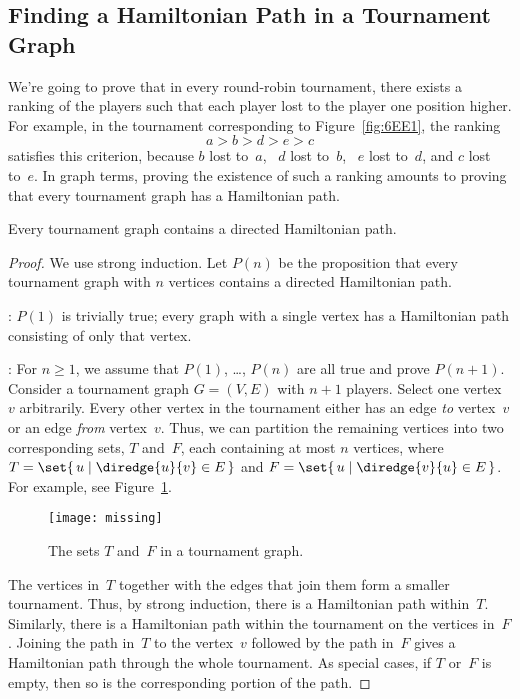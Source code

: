 \subsection{Finding a Hamiltonian Path in a Tournament Graph}

We're going to prove that in every round-robin tournament, there
exists a ranking of the players such that each player lost to the
player one position higher.  For example, in the tournament
corresponding to Figure~\ref{fig:6EE1}, the ranking
\begin{equation*}
    a > b > d > e > c
\end{equation*}
satisfies this criterion, because $b$ lost to~$a$, \ $d$ lost to~$b$,
\ $e$ lost to~$d$, and $c$ lost to~$e$.  In graph terms, proving the
existence of such a ranking amounts to proving that every tournament
graph has a Hamiltonian path.

\begin{theorem}\label{thm:hamilton_tournament}
Every tournament graph contains a directed Hamiltonian path.
\end{theorem}

\begin{proof}

We use strong induction.  Let $P(n)$ be the proposition that every
tournament graph with $n$ vertices contains a directed Hamiltonian
path.

: $P(1)$ is trivially true; every graph with
a single vertex has a Hamiltonian path consisting of only that vertex.

: For $n \ge 1$, we assume that $P(1)$,
\dots, $P(n)$ are all true and prove $P(n + 1)$.  Consider a
tournament graph $G = (V, E)$ with $n + 1$ players.  Select one
vertex~$v$ arbitrarily.  Every other vertex in the tournament either
has an edge \emph{to} vertex~$v$ or an edge \emph{from} vertex~$v$.
Thus, we can partition the remaining vertices into two corresponding
sets, $T$ and~$F$, each containing at most $n$ vertices, where $T =
\set{\, u \mid \diredge{u}{v} \in E \,}$ and
$F = \set{\, u \mid \diredge{v}{u} \in E \,}$.
For example, see Figure~\ref{fig:6EE2}.

\begin{figure}

\missinggraphic

\texttt{[image: missing]}

\caption{The sets $T$ and~$F$ in a tournament graph.}

\label{fig:6EE2}

\end{figure}

The vertices in~$T$ together with the edges that join them form a
smaller tournament.  Thus, by strong induction, there is a Hamiltonian
path within~$T$.  Similarly, there is a Hamiltonian path within the
tournament on the vertices in~$F$.  Joining the path in~$T$ to the
vertex~$v$ followed by the path in~$F$ gives a Hamiltonian path
through the whole tournament.  As special cases, if $T$ or~$F$ is
empty, then so is the corresponding portion of the path.
\end{proof}

